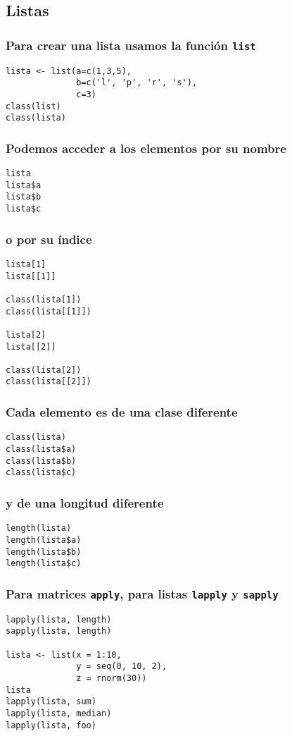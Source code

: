 \documentclass[bigger]{beamer}
\begin{document}
\subsection{Listas}
\label{sec-4-1}
\begin{frame}[fragile]
\frametitle{Para crear una lista usamos la función \texttt{list}}
\label{sec-4-1-1}


\lstset{language=R}
\begin{lstlisting}
lista <- list(a=c(1,3,5),
              b=c('l', 'p', 'r', 's'),
              c=3)
class(list)
class(lista)
\end{lstlisting}
\end{frame}
\begin{frame}[fragile]
\frametitle{Podemos acceder a los elementos por su nombre}
\label{sec-4-1-2}


\lstset{language=R}
\begin{lstlisting}
lista
lista$a
lista$b
lista$c
\end{lstlisting}
\end{frame}
\begin{frame}[fragile]
\frametitle{o por su índice}
\label{sec-4-1-3}


\lstset{language=R}
\begin{lstlisting}
lista[1]
lista[[1]]

class(lista[1])
class(lista[[1]])

lista[2]
lista[[2]]

class(lista[2])
class(lista[[2]])
\end{lstlisting}
\end{frame}
\begin{frame}[fragile]
\frametitle{Cada elemento es de una clase diferente}
\label{sec-4-1-4}


\lstset{language=R}
\begin{lstlisting}
class(lista)
class(lista$a)
class(lista$b)
class(lista$c)
\end{lstlisting}
\end{frame}
\begin{frame}[fragile]
\frametitle{y de una longitud diferente}
\label{sec-4-1-5}


\lstset{language=R}
\begin{lstlisting}
length(lista)
length(lista$a)
length(lista$b)
length(lista$c)
\end{lstlisting}
\end{frame}
\begin{frame}[fragile]
\frametitle{Para matrices \texttt{apply}, para listas \texttt{lapply} y \texttt{sapply}}
\label{sec-4-1-6}


\lstset{language=R}
\begin{lstlisting}
lapply(lista, length)
sapply(lista, length)

lista <- list(x = 1:10,
              y = seq(0, 10, 2),
              z = rnorm(30))
lista
lapply(lista, sum)
lapply(lista, median)
lapply(lista, foo)
\end{lstlisting}
\end{frame}
\end{document}
